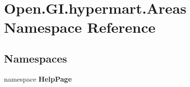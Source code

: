\section{Open.\+G\+I.\+hypermart.\+Areas Namespace Reference}
\label{namespace_open_1_1_g_i_1_1hypermart_1_1_areas}
\subsection*{Namespaces}
\begin{DoxyCompactItemize}
\item 
namespace \textbf{ Help\+Page}
\end{DoxyCompactItemize}
